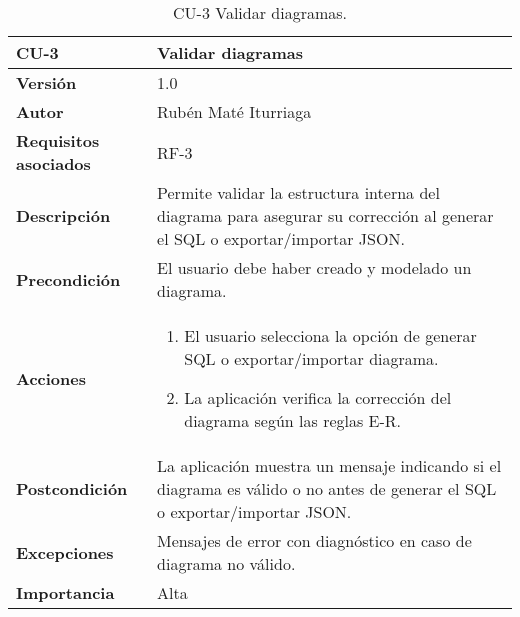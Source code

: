 \begin{table}[p]
	\centering
	\begin{tabularx}{\linewidth}{ p{} p{} }
		\toprule
		\textbf{CU-3}    & \textbf{Validar diagramas}\\
		\toprule
		\textbf{Versión}              & 1.0    \\
	\textbf{Autor}                & Rubén Maté Iturriaga \\
		\textbf{Requisitos asociados} & RF-3 \\
		\textbf{Descripción}          & Permite validar la estructura interna del diagrama para asegurar su corrección al generar el SQL o exportar/importar JSON. \\
		\textbf{Precondición}         & El usuario debe haber creado y modelado un diagrama. \\
		\textbf{Acciones}             &
		\begin{enumerate}
			\def\labelenumi{\arabic{enumi}.}
			\tightlist
			\item El usuario selecciona la opción de generar SQL o exportar/importar diagrama.
			\item La aplicación verifica la corrección del diagrama según las reglas E-R.
		\end{enumerate}\\
		\textbf{Postcondición}        & La aplicación muestra un mensaje indicando si el diagrama es válido o no antes de generar el SQL o exportar/importar JSON. \\
		\textbf{Excepciones}          & Mensajes de error con diagnóstico en caso de diagrama no válido. \\
		\textbf{Importancia}          & Alta \\
		\bottomrule
	\end{tabularx}
	\caption{CU-3 Validar diagramas.}
\end{table}

